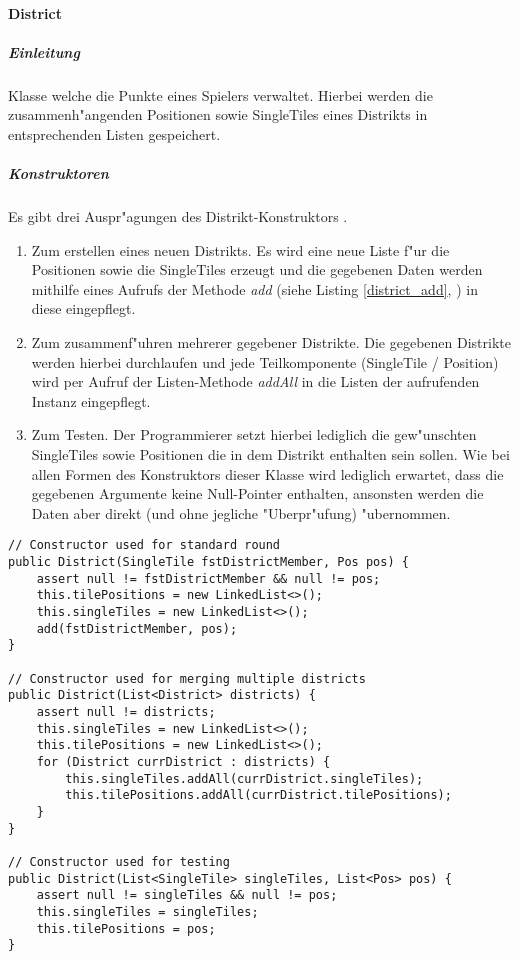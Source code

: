 \paragraph{District}
\label{par:district}
\subparagraph{Einleitung}
Klasse welche die Punkte eines Spielers verwaltet. Hierbei werden die zusammenh"angenden Positionen sowie SingleTiles eines Distrikts in entsprechenden Listen gespeichert. 

\subparagraph{Konstruktoren} 
\label{spar:districtKonstruktoren}
Es gibt drei Auspr"agungen des Distrikt-Konstruktors . 
\begin{enumerate}
	\item Zum erstellen eines neuen Distrikts. Es wird eine neue Liste f"ur die Positionen sowie die SingleTiles erzeugt und die gegebenen Daten werden mithilfe eines Aufrufs der Methode \emph{add} (siehe Listing \ref{district_add}, ) in diese eingepflegt. 
	\item Zum zusammenf"uhren mehrerer gegebener Distrikte. Die gegebenen Distrikte werden hierbei durchlaufen und jede Teilkomponente (SingleTile / Position) wird per Aufruf der Listen-Methode \emph{addAll} in die Listen der aufrufenden Instanz eingepflegt. 
	\item Zum Testen. Der Programmierer setzt hierbei lediglich die gew"unschten SingleTiles sowie Positionen die in dem Distrikt enthalten sein sollen. Wie bei allen Formen des Konstruktors dieser Klasse wird lediglich erwartet, dass die gegebenen Argumente keine Null-Pointer enthalten, ansonsten werden die Daten aber direkt (und ohne jegliche "Uberpr"ufung) "ubernommen.
\end{enumerate}
\begin{lstlisting}[style=CodeHighlighting,float,caption=District - Konstruktoren,label=district_konstruktoren]
// Constructor used for standard round
public District(SingleTile fstDistrictMember, Pos pos) {
    assert null != fstDistrictMember && null != pos;
    this.tilePositions = new LinkedList<>();
    this.singleTiles = new LinkedList<>();
    add(fstDistrictMember, pos);
}

// Constructor used for merging multiple districts
public District(List<District> districts) {
    assert null != districts;
    this.singleTiles = new LinkedList<>();
    this.tilePositions = new LinkedList<>();
    for (District currDistrict : districts) {
        this.singleTiles.addAll(currDistrict.singleTiles);
        this.tilePositions.addAll(currDistrict.tilePositions);
    }
}

// Constructor used for testing 
public District(List<SingleTile> singleTiles, List<Pos> pos) {
    assert null != singleTiles && null != pos;
    this.singleTiles = singleTiles;
    this.tilePositions = pos;
}
\end{lstlisting}

